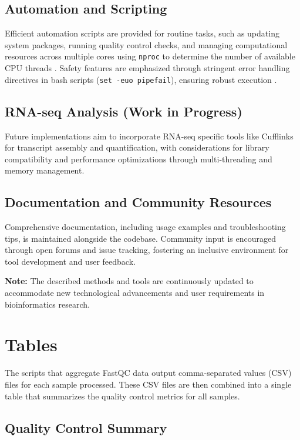 \documentclass[unnumsec,webpdf,contemporary,large]{oup-authoring-template}
\theoremstyle{thmstyleone}%
\theoremstyle{thmstyletwo}%
\theoremstyle{thmstylethree}%
\begin{document}
\subsection{Automation and Scripting}

Efficient automation scripts are provided for routine tasks, such as updating system packages, running quality control checks, and managing computational resources across multiple cores using \texttt{nproc} to determine the number of available CPU threads \citep{Peste2022}. Safety features are emphasized through stringent error handling directives in bash scripts (\texttt{set -euo pipefail}), ensuring robust execution \citep{Nakato2013}.

\subsection{RNA-seq Analysis (Work in Progress)}

Future implementations aim to incorporate RNA-seq specific tools like Cufflinks for transcript assembly and quantification, with considerations for library compatibility and performance optimizations through multi-threading and memory management.

\subsection{Documentation and Community Resources}

Comprehensive documentation, including usage examples and troubleshooting tips, is maintained alongside the codebase. Community input is encouraged through open forums and issue tracking, fostering an inclusive environment for tool development and user feedback.

\textbf{Note:} The described methods and tools are continuously updated to accommodate new technological advancements and user requirements in bioinformatics research.


\section{Tables}

The scripts that aggregate FastQC data output comma-separated values (CSV) files for each sample processed. These CSV files are then combined into a single table that summarizes the quality control metrics for all samples.

\subsection{Quality Control Summary}
\end{document}
